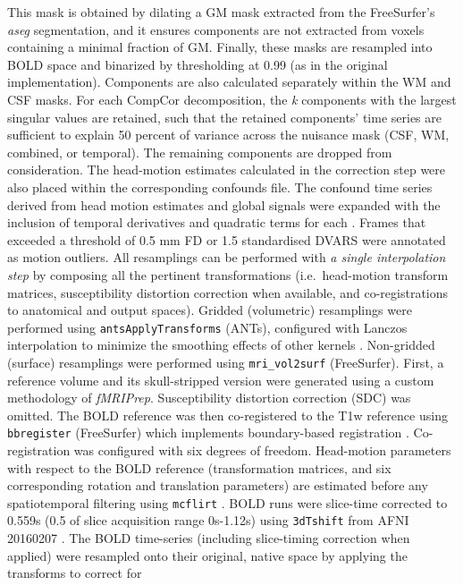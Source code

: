 \documentclass[]{article}
\begin{document}
\begin{description}
This mask is obtained by dilating a GM mask extracted from the
FreeSurfer's \emph{aseg} segmentation, and it ensures components are not
extracted from voxels containing a minimal fraction of GM. Finally,
these masks are resampled into BOLD space and binarized by thresholding
at 0.99 (as in the original implementation). Components are also
calculated separately within the WM and CSF masks. For each CompCor
decomposition, the \emph{k} components with the largest singular values
are retained, such that the retained components' time series are
sufficient to explain 50 percent of variance across the nuisance mask
(CSF, WM, combined, or temporal). The remaining components are dropped
from consideration. The head-motion estimates calculated in the
correction step were also placed within the corresponding confounds
file. The confound time series derived from head motion estimates and
global signals were expanded with the inclusion of temporal derivatives
and quadratic terms for each \citep{confounds_satterthwaite_2013}.
Frames that exceeded a threshold of 0.5 mm FD or 1.5 standardised DVARS
were annotated as motion outliers. All resamplings can be performed with
\emph{a single interpolation step} by composing all the pertinent
transformations (i.e.~head-motion transform matrices, susceptibility
distortion correction when available, and co-registrations to anatomical
and output spaces). Gridded (volumetric) resamplings were performed
using \texttt{antsApplyTransforms} (ANTs), configured with Lanczos
interpolation to minimize the smoothing effects of other kernels
\citep{lanczos}. Non-gridded (surface) resamplings were performed using
\texttt{mri\_vol2surf} (FreeSurfer). First, a reference volume and its
skull-stripped version were generated using a custom methodology of
\emph{fMRIPrep}. Susceptibility distortion correction (SDC) was omitted.
The BOLD reference was then co-registered to the T1w reference using
\texttt{bbregister} (FreeSurfer) which implements boundary-based
registration \citep{bbr}. Co-registration was configured with six
degrees of freedom. Head-motion parameters with respect to the BOLD
reference (transformation matrices, and six corresponding rotation and
translation parameters) are estimated before any spatiotemporal
filtering using \texttt{mcflirt} \citep[FSL 5.0.9,][]{mcflirt}. BOLD
runs were slice-time corrected to 0.559s (0.5 of slice acquisition range
0s-1.12s) using \texttt{3dTshift} from AFNI 20160207
\citep[RRID:SCR\_005927]{afni}. The BOLD time-series (including
slice-timing correction when applied) were resampled onto their
original, native space by applying the transforms to correct for

\end{description}
\end{document}
